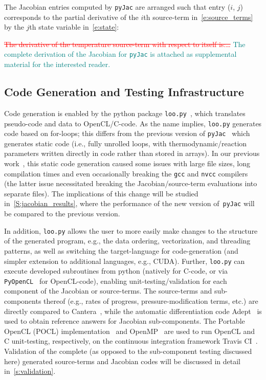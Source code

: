 \documentclass[12pt,number,sort&compress,preprint]{elsarticle}
\newcommand{\add}[1]{{\sloppy\textcolor{teal}{#1}}}  %
\newcommand{\delete}[1]{\sloppy\textcolor{red}{\sout{#1}}} %
\begin{document}
The Jacobian entries computed by \texttt{pyJac} are arranged such that entry ($i$, $j$) corresponds to the partial derivative of the $i$th source-term in~\cref{e:source_terms} by the $j$th state variable in~\cref{e:state}:

\delete{The derivative of the temperature source-term with respect to itself is:\ldots}
\add{The complete derivation of the Jacobian for \texttt{pyJac} is attached as supplemental material for the interested reader.}

\subsection{Code Generation and Testing Infrastructure}
\label{s:unittest}
Code generation is enabled by the python package \texttt{loo.py}~\cite{kloeckner_loopy_2014}, which translates pseudo-code and data to OpenCL\slash C-code.
As the name implies, \texttt{loo.py} generates code based on for-loops; this differs from the previous version of \texttt{pyJac}~\cite{pyjac16} which generates static code (i.e., fully unrolled loops, with thermodynamic\slash reaction parameters written directly in code rather than stored in arrays).
In our previous work~\cite{Niemeyer:2016aa}, this static code generation caused some issues with large file sizes, long compilation times and even occasionally breaking the \texttt{gcc} and \texttt{nvcc} compilers (the latter issue necessitated breaking the Jacobian\slash source-term evaluations into separate files).
The implications of this change will be studied in~\cref{S:jacobian_results}, where the performance of the new version of~\texttt{pyJac} will be compared to the previous version.

In addition, \texttt{loo.py} allows the user to more easily make changes to the structure of the generated program, e.g., the data ordering, vectorization, and threading patterns, as well as switching the target-language for code-generation (and simpler extension to additional languages, e.g., CUDA).
Further, \texttt{loo.py} can execute developed subroutines from python (natively for C-code, or via \texttt{PyOpenCL}~\cite{kloeckner_pycuda_2012} for OpenCL-code), enabling unit-testing\slash validation for each component of the Jacobian or source-terms.
The source-terms and sub-components thereof (e.g., rates of progress, pressure-modification terms, etc.) are directly compared to Cantera~\cite{Cantera}, while the automatic differentiation code Adept~\cite{hogan2014fast,adept-v11} is used to obtain reference answers for Jacobian sub-components.
The Portable OpenCL (POCL) implementation~\cite{poclIJPP} and OpenMP~\cite{dagum1998openmp} are used to run OpenCL and C unit-testing, respectively, on the continuous integration framework Travis CI~\cite{travis:2018}.
Validation of the complete (as opposed to the sub-component testing discussed here) generated source-terms and Jacobian codes will be discussed in detail in~\cref{s:validation}.
\end{document}
